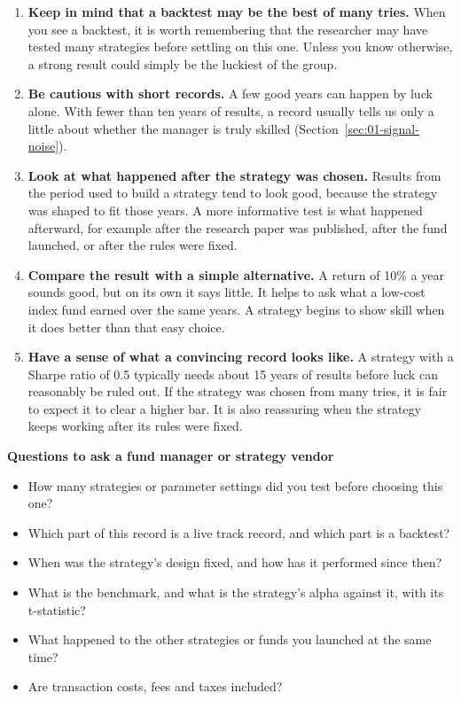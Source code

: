 \begin{enumerate}
  \item \textbf{Keep in mind that a backtest may be the best of many tries.} When you see a backtest, it is worth remembering that the researcher may have tested many strategies before settling on this one. Unless you know otherwise, a strong result could simply be the luckiest of the group.
  \item \textbf{Be cautious with short records.} A few good years can happen by luck alone. With fewer than ten years of results, a record usually tells us only a little about whether the manager is truly skilled (Section~\ref{sec:01-signal-noise}).
  \item \textbf{Look at what happened after the strategy was chosen.} Results from the period used to build a strategy tend to look good, because the strategy was shaped to fit those years. A more informative test is what happened afterward, for example after the research paper was published, after the fund launched, or after the rules were fixed.
  \item \textbf{Compare the result with a simple alternative.} A return of 10\% a year sounds good, but on its own it says little. It helps to ask what a low-cost index fund earned over the same years. A strategy begins to show skill when it does better than that easy choice.
  \item \textbf{Have a sense of what a convincing record looks like.} A strategy with a Sharpe ratio of 0.5 typically needs about 15 years of results before luck can reasonably be ruled out. If the strategy was chosen from many tries, it is fair to expect it to clear a higher bar. It is also reassuring when the strategy keeps working after its rules were fixed.
\end{enumerate}

\textbf{Questions to ask a fund manager or strategy vendor}

\begin{itemize}
  \item How many strategies or parameter settings did you test before choosing this one?
  \item Which part of this record is a live track record, and which part is a backtest?
  \item When was the strategy's design fixed, and how has it performed since then?
  \item What is the benchmark, and what is the strategy's alpha against it, with its t-statistic?
  \item What happened to the other strategies or funds you launched at the same time?
  \item Are transaction costs, fees and taxes included?
\end{itemize}

